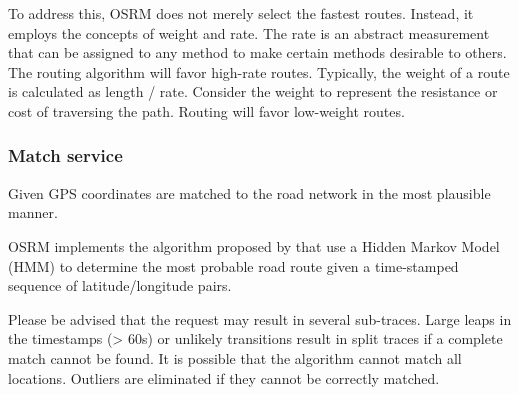 To address this, OSRM does not merely select the fastest routes. Instead, it employs the concepts of weight and rate. The rate is an abstract measurement that can be assigned to any method to make certain methods desirable to others. The routing algorithm will favor high-rate routes. Typically, the weight of a route is calculated as length / rate. Consider the weight to represent the resistance or cost of traversing the path. Routing will favor low-weight routes. 


\autocite[]{Luxen2011}







\subsubsection{Match service}

Given GPS coordinates are matched to the road network in the most plausible manner.

OSRM implements the algorithm proposed by \autocite[]{Yuan2020} that use a Hidden Markov Model (HMM) to determine the most probable road route given a time-stamped sequence of latitude/longitude pairs. 



Please be advised that the request may result in several sub-traces.
Large leaps in the timestamps (> 60s) or unlikely transitions result in split traces if a complete match cannot be found.
It is possible that the algorithm cannot match all locations.
Outliers are eliminated if they cannot be correctly matched. 

